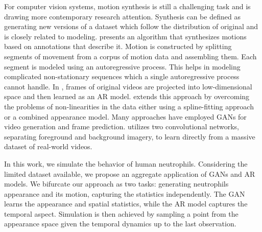 \documentclass{article}
\begin{document}
For computer vision systems, motion synthesis is still a challenging task and is drawing more contemporary research attention. Synthesis can be defined as generating new versions of a dataset which follow the distribution of original and is closely related to modeling. \cite{motionfromannotations} presents an algorithm that synthesizes motions based on annotations that describe it. Motion is constructed by splitting segments of movement from a corpus of motion data and assembling them. Each segment is modeled using an autoregressive process. This helps in modeling complicated non-stationary sequences which a single autoregressive process cannot handle. In \cite{armotionsynthesis}, frames of original videos are projected into low-dimensional space and then learned as an AR model. \cite{ad04bba6acd84038b8d6e913b5669b55} extends this approach by overcoming the problems of non-linearities in the data either using a spline-fitting approach or a combined appearance model. Many approaches have employed GANs for video generation and frame prediction. \cite{DBLP:journals/corr/VillegasYHLL17} utilizes two convolutional networks, separating foreground and background imagery, to learn directly from a massive dataset of real-world videos. \par
In this work, we simulate the behavior of human neutrophils. Considering the limited dataset available, we propose an aggregate application of GANs and AR models. We bifurcate our approach as two tasks: generating neutrophil\textquotesingle s appearance and its motion, capturing the statistics independently. The GAN learns the appearance and spatial statistics, while the AR model captures the temporal aspect. Simulation is then achieved by sampling a point from the appearance space given the temporal dynamics up to the last observation. \par
\vspace{-0.5cm}
\vspace{0.18mm}
\end{document}
